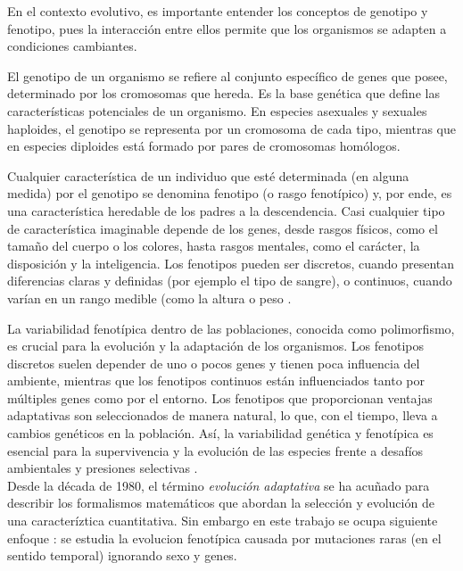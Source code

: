 {{            \normalsize{En el contexto evolutivo, es importante entender los conceptos de genotipo y fenotipo, pues la interacción entre ellos permite que los organismos se adapten a condiciones cambiantes.}
            
            \normalsize{El genotipo de un organismo se refiere al conjunto específico de genes que posee, determinado por los cromosomas que hereda. Es la base genética que define las características potenciales de un organismo. En especies asexuales y sexuales haploides, el genotipo se representa por un cromosoma de cada tipo, mientras que en especies diploides está formado por pares de cromosomas homólogos.}\\

            \normalsize{Cualquier característica de un individuo que esté determinada (en alguna medida) por el genotipo se denomina fenotipo (o rasgo fenotípico) y, por ende, es una característica heredable de los padres a la descendencia. Casi cualquier tipo de característica imaginable depende de los genes, desde rasgos físicos, como el tamaño del cuerpo o los colores, hasta rasgos mentales, como el carácter, la disposición y la inteligencia. Los fenotipos pueden ser discretos, cuando presentan diferencias claras y definidas (por ejemplo el tipo de sangre), o continuos, cuando varían en un rango medible (como la altura o peso {\citep{Dercole}.}\\

            

            \normalsize{La variabilidad fenotípica dentro de las poblaciones, conocida como polimorfismo, es crucial para la evolución y la adaptación de los organismos. Los fenotipos discretos suelen depender de uno o pocos genes y tienen poca influencia del ambiente, mientras que los fenotipos continuos están influenciados tanto por múltiples genes como por el entorno. Los fenotipos que proporcionan ventajas adaptativas son seleccionados de manera natural, lo que, con el tiempo, lleva a cambios genéticos en la población. Así, la variabilidad genética y fenotípica es esencial para la supervivencia y la evolución de las especies frente a desafíos ambientales y presiones selectivas {\citep{Dercole}.}\\

            \normalsize{\citep{Mirrahimi} Desde la década de 1980, el término \textit{evolución adaptativa} se ha acuñado para describir los formalismos matemáticos que abordan la selección y evolución de una caracter\'iztica cuantitativa. Sin embargo en este trabajo se ocupa siguiente enfoque \citep{Dieckmann1996, metz96}: se estudia la evoluci\;on fenot\'ipica causada por mutaciones raras (en el sentido temporal) ignorando sexo y genes.}

}}}}
